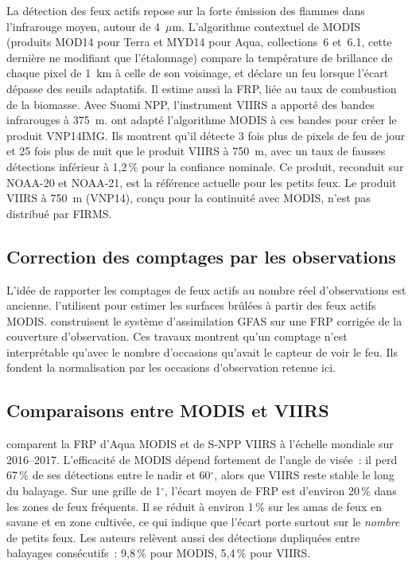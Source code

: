 \documentclass[11pt,a4paper]{article}
\begin{document}
La détection des feux actifs repose sur la forte émission des flammes dans l'infrarouge moyen, autour de 4~$\mu$m. L'algorithme contextuel de MODIS (produits MOD14 pour Terra et MYD14 pour Aqua, collections~6 et~6.1, cette dernière ne modifiant que l'étalonnage) compare la température de brillance de chaque pixel de 1~km à celle de son voisinage, et déclare un feu lorsque l'écart dépasse des seuils adaptatifs. Il estime aussi la FRP, liée au taux de combustion de la biomasse. Avec Suomi NPP, l'instrument VIIRS a apporté des bandes infrarouges à 375~m. \citet{schroeder2014} ont adapté l'algorithme MODIS à ces bandes pour créer le produit VNP14IMG. Ils montrent qu'il détecte 3 fois plus de pixels de feu de jour et 25 fois plus de nuit que le produit VIIRS à 750~m, avec un taux de fausses détections inférieur à 1,2\,\% pour la confiance nominale. Ce produit, reconduit sur NOAA-20 et NOAA-21, est la référence actuelle pour les petits feux. Le produit VIIRS à 750~m (VNP14), conçu pour la continuité avec MODIS, n'est pas distribué par FIRMS.

\subsection{Correction des comptages par les observations}

L'idée de rapporter les comptages de feux actifs au nombre réel d'observations est ancienne. \citet{giglio2006} l'utilisent pour estimer les surfaces brûlées à partir des feux actifs MODIS. \citet{kaiser2012} construisent le système d'assimilation GFAS sur une FRP corrigée de la couverture d'observation. Ces travaux montrent qu'un comptage n'est interprétable qu'avec le nombre d'occasions qu'avait le capteur de voir le feu. Ils fondent la normalisation par les occasions d'observation retenue ici.

\subsection{Comparaisons entre MODIS et VIIRS}

\citet{li2018} comparent la FRP d'Aqua MODIS et de S-NPP VIIRS à l'échelle mondiale sur 2016--2017. L'efficacité de MODIS dépend fortement de l'angle de visée~: il perd 67\,\% de ses détections entre le nadir et 60$^\circ$, alors que VIIRS reste stable le long du balayage. Sur une grille de 1$^\circ$, l'écart moyen de FRP est d'environ 20\,\% dans les zones de feux fréquents. Il se réduit à environ 1\,\% sur les amas de feux en savane et en zone cultivée, ce qui indique que l'écart porte surtout sur le \emph{nombre} de petits feux. Les auteurs relèvent aussi des détections dupliquées entre balayages consécutifs~: 9,8\,\% pour MODIS, 5,4\,\% pour VIIRS.
\end{document}
